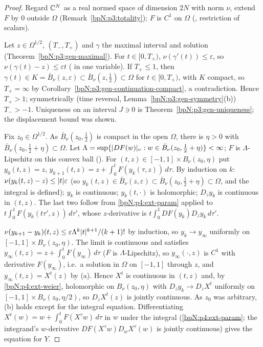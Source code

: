 \begin{proof}
Regard $\mathbb{C}^N$ as a real normed space of dimension $2N$ with norm $\nu$, extend $F$ by $0$ outside $\Omega$ (Remark~\ref{bpN:p3:totality}); $F$ is $C^1$ on $\Omega$ (, restriction of scalars).

\label{stepN:p5:fl-max} Let $z\in\Omega^{1/2}$, $(T_-,T_+)$ and $\gamma$ the maximal interval and solution (Theorem~\ref{bpN:p3:gen-maximal}). For $t\in[0,T_+)$, $\nu(\gamma'(t))\le\varepsilon$, so $\nu(\gamma(t)-z)\le\varepsilon t$ ( in one variable).
If $T_+\le1$, then $\gamma(t)\in K=\bar B_\nu(z,\varepsilon)\subset\bar B_\nu(z,\frac12)\subset\Omega$ for $t\in[0,T_+)$, with $K$ compact, so $T_+=\infty$ by Corollary~\ref{bpN:p3:gen-continuation-compact}, a contradiction. Hence $T_+>1$; symmetrically (time reversal, Lemma~\ref{bpN:p3:gen-symmetry}(b)) $T_->-1$.
Uniqueness on an interval $J\ni 0$ is Theorem~\ref{bpN:p3:gen-uniqueness}; the displacement bound was shown.

\label{stepN:p5:fl-picard} Fix $z_0\in\Omega^{1/2}$. As $\bar B_\nu(z_0,\frac12)$ is compact in the open $\Omega$, there is $\eta>0$ with $\bar B_\nu(z_0,\frac12+\eta)\subset\Omega$. Let $\Lambda=\sup\{\lvert DF(w)\rvert_\nu:w\in\bar B_\nu(z_0,\tfrac12+\eta)\}<\infty$; $F$ is $\Lambda$-Lipschitz on this convex ball ().
For $(t,z)\in[-1,1]\times B_\nu(z_0,\eta)$ put $y_0(t,z)=z$, $y_{k+1}(t,z)=z+\int_0^tF(y_k(\tau,z))\,d\tau$. By induction on $k$: $\nu(y_k(t,z)-z)\le\lvert t\rvert\varepsilon$ (so $y_k(t,z)\in\bar B_\nu(z,\varepsilon)\subset\bar B_\nu(z_0,\frac12+\eta)\subset\Omega$, and the integral is defined);
$y_k$ is continuous; $y_k(t,\cdot)$ is holomorphic; $D_zy_k$ is continuous in $(t,z)$. The last two follow from \ref{bpN:p4:ext-param} applied to $t\int_0^1F(y_k(t\tau',z))\,d\tau'$, whose $z$-derivative is $t\int_0^1DF(y_k)D_zy_k\,d\tau'$.

\label{stepN:p5:fl-limit} $\nu(y_{k+1}-y_k)(t,z)\le\varepsilon\Lambda^k\lvert t\rvert^{k+1}/(k+1)!$ by induction, so $y_k\to y_\infty$ uniformly on $[-1,1]\times B_\nu(z_0,\eta)$. The limit is continuous and satisfies $y_\infty(t,z)=z+\int_0^tF(y_\infty)\,d\tau$ ($F$ is $\Lambda$-Lipschitz), so $y_\infty(\cdot,z)$ is $C^1$ with derivative $F(y_\infty)$, i.e.\ a solution in $\Omega$ on $[-1,1]$ through $z$, and $y_\infty(t,z)=X^t(z)$ by (a).
Hence $X^t$ is continuous in $(t,z)$ and, by \ref{bpN:p4:ext-weier}, holomorphic on $B_\nu(z_0,\eta)$ with $D_zy_k\to D_zX^t$ uniformly on $[-1,1]\times B_\nu(z_0,\eta/2)$, so $D_zX^t(z)$ is jointly continuous. As $z_0$ was arbitrary, (b) holds except for the integral equation. Differentiating $X^t(w)=w+\int_0^tF(X^\tau w)\,d\tau$ in $w$ under the integral (\ref{bpN:p4:ext-param}; the integrand's $w$-derivative $DF(X^\tau w)D_wX^\tau(w)$ is jointly continuous) gives the equation for $Y$.


\end{proof}
